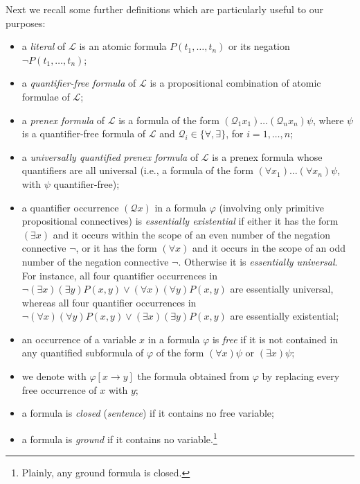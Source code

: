 \documentclass[manyauthors]{fundam}
\newcommand{\Lang}{\ensuremath{\mathcal{L}\xspace}} %
\newcommand{\subst}[3]{#1[#2\rightarrow#3]}
\begin{document}
Next we recall some further definitions which are particularly useful 
to our purposes:
\begin{itemize}
\item a \emph{literal} of $\Lang$ is an atomic formula
   $P(t_1, \ldots, t_n)$ or its negation
   $\neg P(t_1, \ldots, t_n)$;

\item a \emph{quantifier-free formula} of $\Lang$ is a propositional 
combination of atomic formulae of $\Lang$;

\item a \emph{prenex formula} of $\Lang$ is a formula of the form
  $(\mathcal{Q}_1 x_1)\ldots(\mathcal{Q}_n x_n)\psi$, where $\psi$ is 
a quantifier-free formula of $\Lang$ and $\mathcal{Q}_i \in 
\{\forall,\exists\}$, for $i = 1,\ldots,n$;

\item a \emph{universally quantified prenex formula} of $\Lang$ is a 
prenex formula whose quantifiers are all universal (i.e., a formula 
of the form $(\forall x_1) \ldots (\forall x_n)\psi$, with $\psi$ 
quantifier-free);

\item a quantifier occurrence $(\mathcal{Q}x)$ in a formula $\varphi$ 
(involving only primitive propositional connectives) is 
\emph{essentially existential} if either it has the form $(\exists 
x)$ and it occurs within the scope of an even number of the negation 
connective $\neg$, or it has the form $(\forall x)$ and it occurs in 
the scope of an odd number of the negation connective $\neg$. 
Otherwise it is \emph{essentially universal}. For instance, all four 
quantifier occurrences in
$\neg (\exists x)(\exists y)P(x,y) \vee (\forall x)(\forall y)P(x,y)$ 
are essentially universal, whereas all four quantifier occurrences in 
$\neg (\forall x)(\forall y)P(x,y) \vee (\exists x)(\exists y)P(x,y)$ 
are essentially existential;

\item an occurrence of a variable $x$ in a formula $\varphi$ is 
\emph{free} if it is not contained in any quantified subformula of 
$\varphi$ of the form $(\forall x)\psi$ or $(\exists x)\psi$;

\item we denote with $\subst{\varphi}{x}{y}$ the formula obtained 
from $\varphi$ by replacing every free occurrence of $x$ with $y$;

\item a formula is \emph{closed} (\emph{sentence}) if it contains no 
free variable;

\item a formula is \emph{ground} if it contains no 
variable.\footnote{Plainly, any ground formula is closed.}

\end{itemize}
\end{document}
